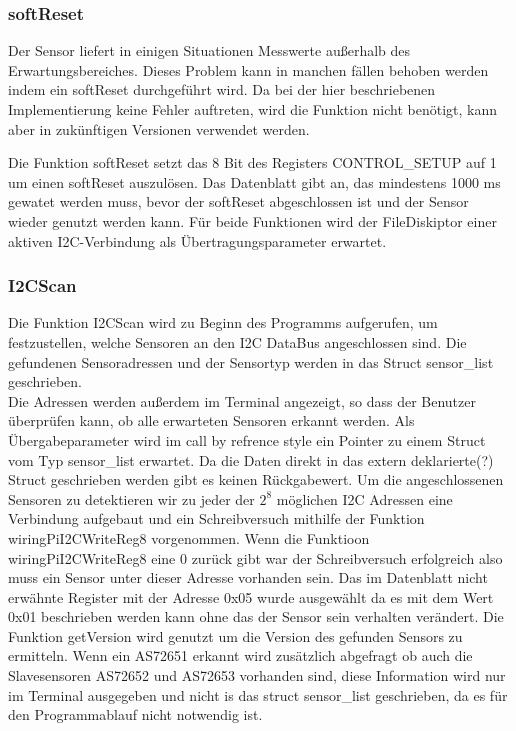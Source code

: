 %

\subsubsection{softReset}
Der Sensor liefert in einigen Situationen Messwerte außerhalb des Erwartungsbereiches.
Dieses Problem kann in manchen fällen behoben werden indem ein softReset durchgeführt wird.
Da bei der hier beschriebenen Implementierung keine Fehler auftreten, wird die Funktion nicht benötigt, kann aber in zukünftigen Versionen verwendet werden.

Die Funktion softReset setzt das 8 Bit des Registers CONTROL\_SETUP auf 1 um einen softReset auszulösen.
Das Datenblatt gibt an, das mindestens 1000 ms gewatet werden muss, bevor der softReset abgeschlossen ist und der Sensor wieder genutzt werden kann.
Für beide Funktionen wird der FileDiskiptor einer aktiven I2C-Verbindung als Übertragungsparameter erwartet.\\

%

\subsubsection{I2CScan}
Die Funktion I2CScan wird zu Beginn des Programms aufgerufen, um festzustellen, welche Sensoren an den I2C DataBus angeschlossen sind.
Die gefundenen Sensoradressen und der Sensortyp werden in das Struct sensor\_list geschrieben.\\
Die Adressen werden außerdem im Terminal angezeigt, so dass der Benutzer überprüfen kann, ob alle erwarteten Sensoren erkannt werden.
Als Übergabeparameter wird im call by refrence style ein Pointer zu einem Struct vom Typ sensor\_list erwartet.
Da die Daten direkt in das extern deklarierte(?) Struct geschrieben werden gibt es keinen Rückgabewert.
Um die angeschlossenen Sensoren zu detektieren wir zu jeder der $2^8$ möglichen I2C Adressen eine Verbindung aufgebaut und ein Schreibversuch mithilfe der Funktion wiringPiI2CWriteReg8 vorgenommen.
Wenn die Funktioon wiringPiI2CWriteReg8 eine 0 zurück gibt war der Schreibversuch erfolgreich also muss ein Sensor unter dieser Adresse vorhanden sein.
Das im Datenblatt nicht erwähnte Register mit der Adresse 0x05 wurde ausgewählt da es mit dem Wert 0x01 beschrieben werden kann ohne das der Sensor sein verhalten verändert.
Die Funktion getVersion wird genutzt um die Version des gefunden Sensors zu ermitteln.
Wenn ein AS72651 erkannt wird zusätzlich abgefragt ob auch die Slavesensoren AS72652 und AS72653 vorhanden sind, diese Information wird nur im Terminal ausgegeben und nicht is das struct sensor\_list geschrieben, da es für den Programmablauf nicht notwendig ist.\\

